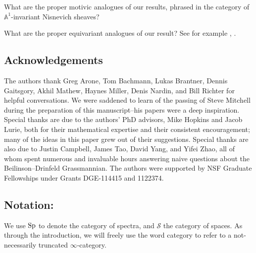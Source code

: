 \begin{qst}
What are the proper motivic analogues of our results, phrased in the category of $\mathbb{A}^1$-invariant Nisnevich sheaves?
\end{qst}

\begin{qst}
What are the proper equivariant analogues of our result?  See for example \cite{Ullman}, \cite{Tynan}.
\end{qst}

\subsection*{Acknowledgements}
The authors thank Greg Arone, Tom Bachmann, Lukas Brantner, Dennis Gaitsgory, Akhil Mathew, Haynes Miller, Denis Nardin, and Bill Richter for helpful conversations.  We were saddened to learn of the passing of Steve Mitchell during the preparation of this manuscript--his papers were a deep inspiration.  Special thanks are due to the authors' PhD advisors, Mike Hopkins and Jacob Lurie, both for their mathematical expertise and their consistent encouragement; many of the ideas in this paper grew out of their suggestions.  Special thanks are also due to Justin Campbell, James Tao, David Yang, and Yifei Zhao, all of whom spent numerous and invaluable hours answering naive questions about the Beilinson--Drinfeld Grassmannian.  The authors were supported by NSF Graduate Fellowships under Grants DGE-114415 and 1122374.

\subsection*{Notation:} We use $\operatorname{\mathrm{Sp}}$ to denote the category of spectra, and $\mathcal{S}$ the category of spaces.  As through the introduction, we will freely use the word category to refer to a not-necessarily truncated $\infty$-category.
